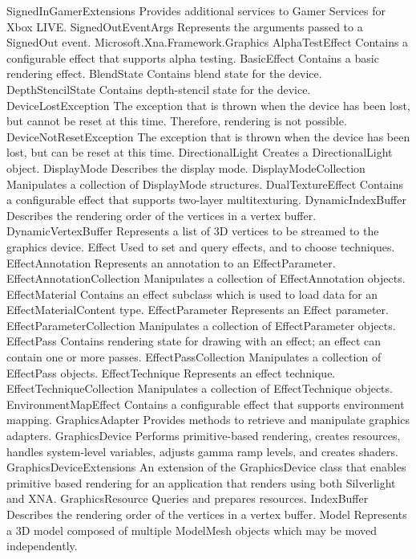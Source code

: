 	SignedInGamerExtensions	Provides additional services to Gamer Services for Xbox LIVE.
	SignedOutEventArgs	Represents the arguments passed to a SignedOut event.
Microsoft.Xna.Framework.Graphics
  AlphaTestEffect	Contains a configurable effect that supports alpha testing.
	BasicEffect	Contains a basic rendering effect.
	BlendState	Contains blend state for the device.
	DepthStencilState	Contains depth-stencil state for the device.
	DeviceLostException	The exception that is thrown when the device has been lost, but cannot be reset at this time. Therefore, rendering is not possible.
	DeviceNotResetException	The exception that is thrown when the device has been lost, but can be reset at this time.
	DirectionalLight	Creates a DirectionalLight object.
	DisplayMode	Describes the display mode.
	DisplayModeCollection	Manipulates a collection of DisplayMode structures.
	DualTextureEffect	Contains a configurable effect that supports two-layer multitexturing.
	DynamicIndexBuffer	Describes the rendering order of the vertices in a vertex buffer.
	DynamicVertexBuffer	Represents a list of 3D vertices to be streamed to the graphics device.
	Effect	Used to set and query effects, and to choose techniques.
	EffectAnnotation	Represents an annotation to an EffectParameter.
	EffectAnnotationCollection	Manipulates a collection of EffectAnnotation objects.
	EffectMaterial	 Contains an effect subclass which is used to load data for an EffectMaterialContent type.
	EffectParameter	Represents an Effect parameter.
	EffectParameterCollection	Manipulates a collection of EffectParameter objects.
	EffectPass	Contains rendering state for drawing with an effect; an effect can contain one or more passes.
	EffectPassCollection	Manipulates a collection of EffectPass objects.
	EffectTechnique	Represents an effect technique.
	EffectTechniqueCollection	Manipulates a collection of EffectTechnique objects.
	EnvironmentMapEffect	Contains a configurable effect that supports environment mapping.
	GraphicsAdapter	Provides methods to retrieve and manipulate graphics adapters.
	GraphicsDevice	Performs primitive-based rendering, creates resources, handles system-level variables, adjusts gamma ramp levels, and creates shaders.
	GraphicsDeviceExtensions	An extension of the GraphicsDevice class that enables primitive based rendering for an application that renders using both Silverlight and XNA.
	GraphicsResource	Queries and prepares resources.
	IndexBuffer	Describes the rendering order of the vertices in a vertex buffer.
	Model	Represents a 3D model composed of multiple ModelMesh objects which may be moved independently.
